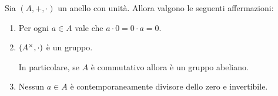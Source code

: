 \begin{proposition}
    \label{prop:prop_anelli}
    Sia $(A, +, \cdot)$ un anello con unità. Allora valgono le seguenti affermazioni:
    \begin{enumerate}[label={(\roman*)}, ref={\theproposition: (\roman*)}]
        \item \label{prop:prop_anelli:per_0} Per ogni $a \in A$ vale che $a \cdot 0 = 0 \cdot a = 0$.
        \item \label{prop:prop_anelli:gruppo_inv} $(A^{\times}, \cdot)$ è un gruppo. 
        
        In particolare, se $A$ è commutativo allora è un gruppo abeliano.
        \item \label{prop:prop_anelli:div_zero_inv} Nessun $a \in A$ è contemporaneamente divisore dello zero e invertibile.
    \end{enumerate}
\end{proposition}
